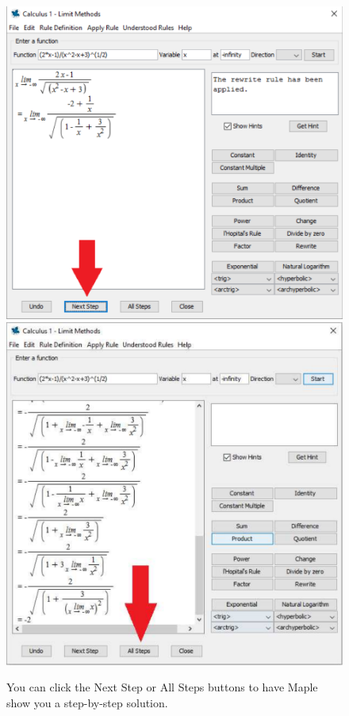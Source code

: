 \begin{figure}[h]
\caption{You can click the Next Step or All Steps buttons to have Maple show you a step-by-step solution.}
\centering
\includegraphics[width=\textwidth]{tutorials/figures/LimitTutorQ2-2-eps-converted-to.pdf}
\includegraphics[width=\textwidth]{tutorials/figures/LimitTutorQ2-3-eps-converted-to.pdf}
\end{figure}
